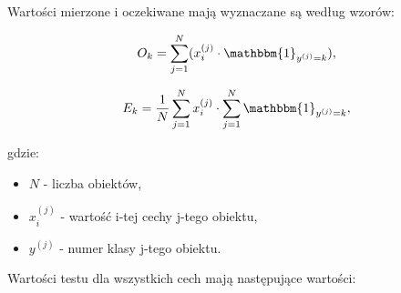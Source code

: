     Wartości mierzone i oczekiwane mają wyznaczane są według wzorów:

    \begin{equation}
        O_k = \sum_{j=1}^{N} (x_i^{(j)} \cdot \mathbbm{1}_{y^{(j)}=k}),
    \end{equation}


    \begin{equation}
        E_k = \frac{1}{N} \sum_{j=1}^{N} {x_i^{(j)}} \cdot \sum_{j=1}^{N} {\mathbbm{1}_{y^{(j)}=k}},
    \end{equation}

    gdzie:
    \begin{itemize}
        \item $N$ - liczba obiektów,
        \item $x_i^{(j)}$ - wartość i-tej cechy j-tego obiektu,
        \item $y^{(j)}$ - numer klasy j-tego obiektu.
    \end{itemize}

    Wartości testu dla wszystkich cech mają następujące wartości:

    \vspace{1em}

